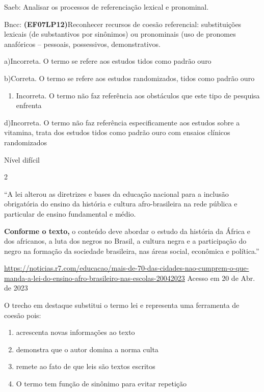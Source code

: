 {{Saeb: Analisar os processos de referenciação lexical e pronominal.

Bncc: \textbf{(EF07LP12)}Reconhecer recursos de coesão referencial:
substituições lexicais (de substantivos por sinônimos) ou pronominais
(uso de pronomes anafóricos -- pessoais, possessivos, demonstrativos.

a)Incorreta. O termo se refere aos estudos tidos como padrão ouro

b)Correta. O termo se refere aos estudos randomizados, tidos como padrão
ouro

\begin{enumerate}
\def\labelenumi{\arabic{enumi}.}
\tightlist
\item
  Incorreta. O termo não faz referência aos obstáculos que este tipo de
  pesquisa enfrenta
\end{enumerate}

d)Incorreta. O termo não faz referência especificamente aos estudos
sobre a vitamina, trata dos estudos tidos como padrão ouro com ensaios
clínicos randomizados

Nível difícil

\num{2}

``A lei alterou as diretrizes e bases da educação nacional para a
inclusão obrigatória do ensino da história e cultura afro-brasileira na
rede pública e particular de ensino fundamental e médio.

\textbf{Conforme o texto,} o conteúdo deve abordar o estudo da história
da África e dos africanos, a luta dos negros no Brasil, a cultura negra
e a participação do negro na formação da sociedade brasileira, nas áreas
social, econômica e política.''

\href{https://noticias.r7.com/educacao/mais-de-70-das-cidades-nao-cumprem-o-que-manda-a-lei-do-ensino-afro-brasileiro-nas-escolas-20042023}{\uline{https://noticias.r7.com/educacao/mais-de-70-das-cidades-nao-cumprem-o-que-manda-a-lei-do-ensino-afro-brasileiro-nas-escolas-20042023}}
Acesso em 20 de Abr. de 2023

O trecho em destaque substitui o termo lei e representa uma ferramenta
de coesão pois:

\begin{enumerate}
\def\labelenumi{\alph{enumi})}
\item
  acrescenta novas informações ao texto
\item
  demonstra que o autor domina a norma culta
\item
  remete ao fato de que leis são textos escritos
\item
  O termo tem função de sinônimo para evitar repetição
\end{enumerate}

}}
